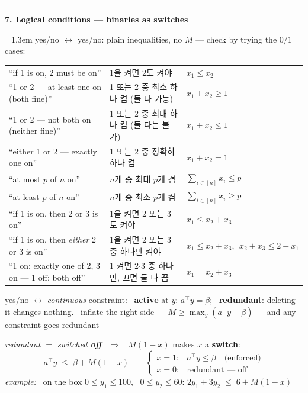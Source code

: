 \documentclass[10pt]{article}
\newcommand{\beat}[2]{%
  \par\medskip
  {\color{ruleink}\rule{\textwidth}{1pt}}\par\nobreak\vspace{2pt}
  {\large\bfseries #1.\; #2}\par\nobreak\vspace{3pt}}
\newenvironment{board}{%
  \par\vspace{2pt}
  \begingroup\leftskip=1.3em\relax}{%
  \par\endgroup\vspace{2pt}}
\begin{document}
\beat{7}{Logical conditions --- binaries as switches}
\begin{board}
yes/no $\leftrightarrow$ yes/no: plain inequalities, no $M$ --- check by trying the $0/1$ cases:
\vspace{3pt}

\begin{center}
\begin{tabular}{lll}
 ``if 1 is on, 2 must be on'' & {\footnotesize 1을 켜면 2도 켜야} & $x_1 \le x_2$ \\[2pt]
 ``1 or 2 --- at least one on (both fine)'' & {\footnotesize 1 또는 2 중 최소 하나 켬 (둘 다 가능)} & $x_1 + x_2 \ge 1$ \\[2pt]
 ``1 or 2 --- not both on (neither fine)'' & {\footnotesize 1 또는 2 중 최대 하나 켬 (둘 다는 불가)} & $x_1 + x_2 \le 1$ \\[2pt]
 ``either 1 or 2 --- exactly one on'' & {\footnotesize 1 또는 2 중 정확히 하나 켬} & $x_1 + x_2 = 1$ \\[2pt]
 ``at most $p$ of $n$ on'' & {\footnotesize $n$개 중 최대 $p$개 켬} & $\sum_{i \in [n]} x_i \le p$ \\[2pt]
 ``at least $p$ of $n$ on'' & {\footnotesize $n$개 중 최소 $p$개 켬} & $\sum_{i \in [n]} x_i \ge p$ \\[2pt]
 ``if 1 is on, then 2 or 3 is on'' & {\footnotesize 1을 켜면 2 또는 3도 켜야} & $x_1 \le x_2 + x_3$ \\[2pt]
 ``if 1 is on, then \emph{either} 2 or 3 is on'' & {\footnotesize 1을 켜면 2 또는 3 중 하나만 켜야} & $x_1 \le x_2 + x_3, \ \ x_2 + x_3 \le 2 - x_1$ \\[2pt]
 ``1 on: exactly one of 2, 3 on --- 1 off: both off'' & {\footnotesize 1 켜면 2$\cdot$3 중 하나만, 끄면 둘 다 끔} & $x_1 = x_2 + x_3$ \\
\end{tabular}
\end{center}
\vspace{4pt}

yes/no $\leftrightarrow$ \emph{continuous} constraint: \
\textbf{active} at $\bar y$: $a^{\top}\bar y = \beta$; \ \textbf{redundant}: deleting it changes nothing.
\ inflate the right side --- $M \ge \max_y (a^{\top}y - \beta)$ --- and any constraint goes redundant
\vspace{3pt}

\emph{redundant $=$ switched \textbf{off}} \ $\Rightarrow$ \ $M(1-x)$ makes $x$ a \textbf{switch}:
\[
  a^{\top}y \;\le\; \beta + M(1-x)
  \qquad
  \begin{cases}
    x = 1: & a^{\top}y \le \beta \quad \text{(enforced)}\\[2pt]
    x = 0: & \text{redundant --- off}
  \end{cases}
\]
\emph{example:} \ on the box $0 \le y_1 \le 100$, \ $0 \le y_2 \le 60$:
\quad $2y_1 + 3y_2 \;\le\; 6 + M(1-x)$
\vspace{1pt}


\end{board}
\end{document}
